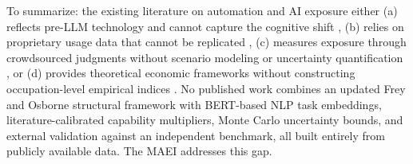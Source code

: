 To summarize: the existing literature on automation and AI exposure either (a) reflects pre-LLM technology and cannot capture the cognitive shift \citep{Frey_Osborne_2017}, (b) relies on proprietary usage data that cannot be replicated \citep{Anthropic_2026}, (c) measures exposure through crowdsourced judgments without scenario modeling or uncertainty quantification \citep{Felten_Raj_Seamans_2021}, or (d) provides theoretical economic frameworks without constructing occupation-level empirical indices \citep{Acemoglu_Restrepo_2018}. No published work combines an updated Frey and Osborne structural framework with BERT-based NLP task embeddings, literature-calibrated capability multipliers, Monte Carlo uncertainty bounds, and external validation against an independent benchmark, all built entirely from publicly available data. The MAEI addresses this gap.
